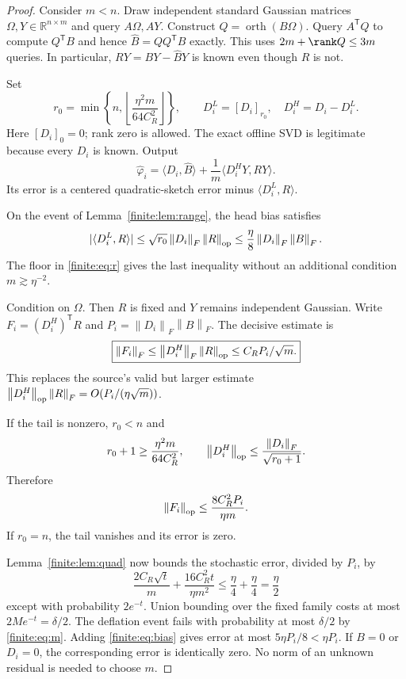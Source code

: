 \documentclass[11pt,oneside,openany,a4paper]{book}
\numberwithin{equation}{chapter}
\theoremstyle{definition}
\theoremstyle{remark}
\newcommand{\R}{\mathbb R}\newcommand{\E}{\mathbb E}\newcommand{\Prb}{\mathbb P}\newcommand{\PP}{\mathbb P}
\newcommand{\T}{\mathsf T}\newcommand{\Id}{I}
\newcommand{\F}[1]{\left\lVert#1\right\rVert_F}
\newcommand{\op}[1]{\left\lVert#1\right\rVert_{\rm op}}
\DeclareMathOperator{\orth}{orth}\DeclareMathOperator*{\argmin}{arg\,min}
\begin{document}
\begin{proof}
Consider $m<n$. Draw independent standard Gaussian matrices $\Omega,Y\in\R^{n\times m}$ and query $A\Omega,AY$. Construct $Q=\orth(B\Omega)$. Query $A^\T Q$ to compute $Q^\T B$ and hence $\widehat B=QQ^\T B$ exactly. This uses $2m+\rank Q\le3m$ queries. In particular, $RY=BY-\widehat BY$ is known even though $R$ is not.

Set
\begin{equation}\label{finite:eq:r}
r_0=\min\!\left\{n,\left\lfloor\frac{\eta^2m}{64C_R^2}\right\rfloor\right\},\qquad
D_i^L=[D_i]_{r_0},\quad D_i^H=D_i-D_i^L.
\end{equation}
Here $[D_i]_0=0$; rank zero is allowed. The exact offline SVD is legitimate because every $D_i$ is known. Output
\begin{equation}\label{finite:eq:estimator}
\widehat\varphi_i=\langle D_i,\widehat B\rangle
+\frac1m\langle D_i^HY,RY\rangle.
\end{equation}
Its error is a centered quadratic-sketch error minus $\langle D_i^L,R\rangle$.

On the event of Lemma~\ref{finite:lem:range}, the head bias satisfies
\begin{equation}\label{finite:eq:bias}
|\langle D_i^L,R\rangle|
\le\sqrt{r_0}\F{D_i}\op R
\le\frac\eta8\F{D_i}\F B.
\end{equation}
The floor in \eqref{finite:eq:r} gives the last inequality without an additional condition $m\gtrsim\eta^{-2}$.

Condition on $\Omega$. Then $R$ is fixed and $Y$ remains independent Gaussian. Write $F_i=(D_i^H)^\T R$ and $P_i=\F{D_i}\F B$. The decisive estimate is
\begin{equation}\label{finite:eq:betterF}
\boxed{\F{F_i}\le\F{D_i^H}\op R\le C_RP_i/\sqrt m.}
\end{equation}
This replaces the source's valid but larger estimate $\op{D_i^H}\F R=O(P_i/(\eta\sqrt m))$.

If the tail is nonzero, $r_0<n$ and
\[
r_0+1\ge\frac{\eta^2m}{64C_R^2},\qquad
\op{D_i^H}\le\frac{\F{D_i}}{\sqrt{r_0+1}}.
\]
Therefore
\begin{equation}\label{finite:eq:betterop}
\op{F_i}\le\frac{8C_R^2P_i}{\eta m}.
\end{equation}
If $r_0=n$, the tail vanishes and its error is zero.

Lemma~\ref{finite:lem:quad} now bounds the stochastic error, divided by $P_i$, by
\[
\frac{2C_R\sqrt t}{m}+\frac{16C_R^2t}{\eta m^2}
\le\frac\eta4+\frac\eta4=\frac\eta2
\]
except with probability $2e^{-t}$. Union bounding over the fixed family costs at most $2Me^{-t}=\delta/2$. The deflation event fails with probability at most $\delta/2$ by \eqref{finite:eq:m}. Adding \eqref{finite:eq:bias} gives error at most $5\eta P_i/8<\eta P_i$. If $B=0$ or $D_i=0$, the corresponding error is identically zero. No norm of an unknown residual is needed to choose $m$.
\end{proof}
\end{document}
